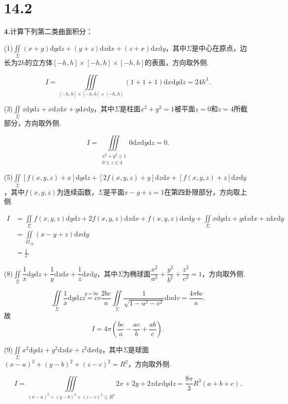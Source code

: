 \documentclass[12pt, a4paper]{article}
\newcommand{\dif}{\mathrm{d}}
\begin{document}
\section*{14.2}
\textbf{4.}计算下列第二类曲面积分：

(1)\(\iint\limits_\Sigma (x + y) \dif y \dif z + (y + z) \dif z \dif x + (z + x) \dif x \dif y\)，其中\(\Sigma\)是中心在原点，边长为\(2h\)的立方体\([-h, h] \times [-h, h] \times [-h, h]\)的表面，方向取外侧.

\[I = \iiint\limits_{[-h, h] \times [-h, h] \times [-h, h]} (1 + 1 + 1) \dif x \dif y \dif z = 24h^3.\]

(3)\(\iint\limits_\Sigma z \dif y \dif z + x \dif z \dif x + y \dif x \dif y\)，其中\(\Sigma\)是柱面\(x^2 + y^2 = 1\)被平面\(z = 0\)和\(z = 4\)所截部分，方向取外侧.

\[I = \iiint\limits_{\substack{x^2 + y^2 \leq 1 \\0 \leq z \leq 4}} 0 \dif x \dif y \dif z = 0.\]

(5)\(\iint\limits_\Sigma [f(x, y, z) + x] \dif y \dif z + [2f(x, y, z) + y] \dif z \dif x + [f(x, y, z) + z] \dif x \dif y\)，其中\(f(x, y, z)\)为连续函数，\(\Sigma\)是平面\(x - y + z = 1\)在第四卦限部分，方向取上侧.

\begin{align*}
I &= \iint\limits_\Sigma f(x, y, z) \dif y \dif z + 2f(x, y, z) \dif z \dif x + f(x, y, z) \dif x \dif y + \iint\limits_\Sigma  x \dif y \dif z + y \dif z \dif x + z \dif x \dif y \\
&= \iint\limits_{D_{xy}} (x - y + z) \dif x \dif y \\
&= \frac{1}{2}.
\end{align*}

(8)\(\iint\limits_\Sigma \dfrac{1}{x} \dif y \dif z + \dfrac{1}{y} \dif z \dif x + \dfrac{1}{z} \dif x \dif y\)，其中\(\Sigma\)为椭球面\(\dfrac{x^2}{a^2} + \dfrac{y^2}{b^2} + \dfrac{z^2}{c^2} = 1\)，方向取外侧.

\[\iint\limits_\Sigma \frac{1}{x} \dif y \dif z \overset{y = bu}{z = cv} \frac{2bc}{a}\iint\limits_\Sigma \frac{1}{\sqrt{1 - u^2 - v^2}} \dif u \dif v = \frac{4\pi bc}{a}.\]
故
\[I = 4\pi\left(\frac{bc}{a} - \frac{ac}{b} + \frac{ab}{c}\right).\]

(9)\(\iint\limits_\Sigma x^2 \dif y \dif z + y^2 \dif z \dif x + z^2 \dif x \dif y\)，其中\(\Sigma\)是球面\((x - a)^2 + (y - b)^2 + (z - c)^2 = R^2\)，方向取外侧.

\[I = \iiint\limits_{(x - a)^2 + (y - b)^2 + (z - c)^2 \leq R^2} 2x + 2y + 2z \dif x \dif y \dif z = \frac{8\pi}{3}R^3(a + b + c).\]
\end{document}
